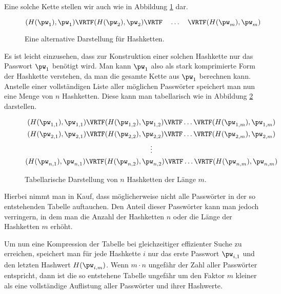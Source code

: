 Eine solche Kette stellen wir auch wie in Abbildung \ref{fig:auth:hashchainalternative} dar.

\begin{figure}[h]
	\begin{equation*}
		(H(\pw_{1}),\pw_{1})
      	\VRTF
		(H(\pw_{2}),\pw_{2})
		\VRTF\quad \ldots \quad \VRTF
		(H(\pw_{m}),\pw_{m})
	\end{equation*}
	\caption{Eine alternative Darstellung für Hashketten.}
	\label{fig:auth:hashchainalternative}
\end{figure}

Es ist leicht einzusehen, dass zur Konstruktion einer solchen Hashkette nur das Passwort $\pw_1$ benötigt wird. Man kann $\pw_1$ also als stark komprimierte Form der Hashkette verstehen, da man die gesamte Kette aus $\pw_1$ berechnen kann.\\

Anstelle einer vollständigen Liste aller möglichen Passwörter speichert man nun eine Menge von $n$ Hashketten. Diese kann man tabellarisch wie in Abbildung \ref{fig:auth:hashchains} darstellen.

\begin{figure}[h]
	\begin{gather*}
      (H(\pw_{1,1}),\pw_{1,1})
      \VRTF
      (H(\pw_{1,2}),\pw_{1,2})
      \VRTF\ldots\VRTF
      (H(\pw_{1,m}),\pw_{1,m})\\
      (H(\pw_{2,1}),\pw_{2,1})
      \VRTF
      (H(\pw_{2,2}),\pw_{2,2})
      \VRTF\ldots\VRTF
      (H(\pw_{2,m}),\pw_{2,m})\\
      \vdots\\
      (H(\pw_{n,1}),\pw_{n,1})
      \VRTF
      (H(\pw_{n,2}),\pw_{n,2})
      \VRTF\ldots\VRTF
      (H(\pw_{n,m}),\pw_{n,m})
	\end{gather*}
	\caption{Tabellarische Darstellung von $n$ Hashketten der Länge $m$.}
	\label{fig:auth:hashchains}
\end{figure}

Hierbei nimmt man in Kauf, dass möglicherweise nicht alle Passwörter in der so entstehenden Tabelle auftauchen. Den Anteil dieser Passwörter kann man jedoch verringern, in dem man die Anzahl der Hashketten $n$ oder die Länge der Hashketten $m$ erhöht.

Um nun eine Kompression der Tabelle bei gleichzeitiger effizienter Suche zu erreichen, speichert man für jede Hashkette $i$ nur das erste Passwort $\pw_{i,1}$ und den letzten Hashwert $H(\pw_{i,m})$. Wenn $m \cdot n$ ungefähr der Zahl aller Passwörter entspricht, dann ist die so entstehene Tabelle ungefähr um den Faktor $m$ kleiner als eine vollständige Auflistung aller Passwörter und ihrer Hashwerte.

